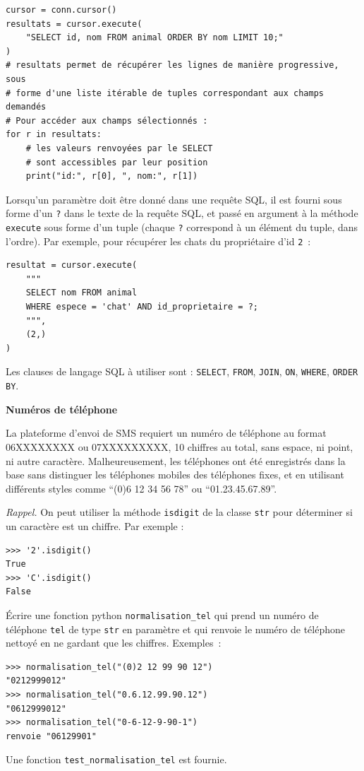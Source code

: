 \documentclass[a4paper,12pt]{article}
\begin{document}
\begin{verbatim}
cursor = conn.cursor()
resultats = cursor.execute(
    "SELECT id, nom FROM animal ORDER BY nom LIMIT 10;"
)
# resultats permet de récupérer les lignes de manière progressive, sous 
# forme d'une liste itérable de tuples correspondant aux champs demandés
# Pour accéder aux champs sélectionnés :
for r in resultats:
    # les valeurs renvoyées par le SELECT
    # sont accessibles par leur position
    print("id:", r[0], ", nom:", r[1])
\end{verbatim}

Lorsqu’un paramètre doit être donné dans une requête SQL, il est fourni sous
forme d’un \verb|?| dans le texte de la requête SQL, et passé en argument à la
méthode \verb|execute| sous forme d’un tuple (chaque \verb|?| correspond à un
élément du tuple, dans l'ordre). Par exemple, pour récupérer les chats du
propriétaire d’id \verb|2| :

\begin{verbatim}
resultat = cursor.execute(
    """
    SELECT nom FROM animal
    WHERE espece = 'chat' AND id_proprietaire = ?;
    """,
    (2,)
)   
\end{verbatim}

Les clauses de langage SQL à utiliser sont : \verb|SELECT|, \verb|FROM|,
\verb|JOIN|, \verb|ON|, \verb|WHERE|, \verb|ORDER BY|.

\textbf{Numéros de téléphone}

La plateforme d’envoi de SMS requiert un numéro de téléphone au format
06XXXXXXXX ou \newline 07XXXXXXXXX, 10 chiffres au total, sans espace, ni
point, ni autre caractère. Malheureusement, les téléphones ont été enregistrés
dans la base sans distinguer les téléphones mobiles des téléphones fixes, et en
utilisant différents styles comme “(0)6 12 34 56 78” ou “01.23.45.67.89”.

\textit{Rappel.} On peut utiliser la méthode \verb|isdigit| de la classe
\verb|str| pour déterminer si un caractère est un chiffre. Par exemple :

\begin{verbatim}
>>> '2'.isdigit()
True
>>> 'C'.isdigit()
False
\end{verbatim}

\begin{question}
    Écrire une fonction python \verb|normalisation_tel| qui prend un numéro de
    téléphone \verb|tel| de type \verb|str| en paramètre et qui renvoie le numéro
    de téléphone nettoyé en ne gardant que les chiffres. Exemples :

    \begin{verbatim}
>>> normalisation_tel("(0)2 12 99 90 12")
"0212999012"
>>> normalisation_tel("0.6.12.99.90.12")
"0612999012"
>>> normalisation_tel("0-6-12-9-90-1")
renvoie "06129901"   
    \end{verbatim}
    \vspace{-5mm}
    Une fonction \verb|test_normalisation_tel| est fournie.
\end{question}
\end{document}
